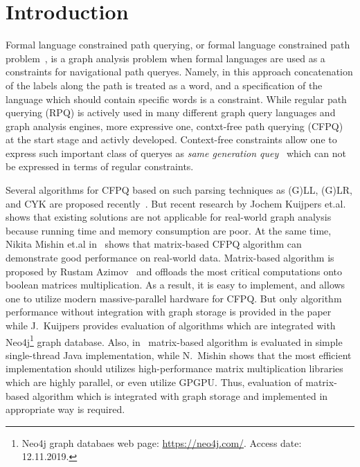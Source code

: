 \section{Introduction}

Formal language constrained path querying, or formal language constrained path problem~\cite{FLCpathProblem}, is a graph analysis problem when formal languages are used as a constraints for navigational path queryes.
Namely, in this approach concatenation of the labels along the path is treated as a word, and a specification of the language which should contain specific words is a constraint.
While regular path querying (RPQ) is actively used in many different graph query languages and graph analysis engines, more expressive one, contxt-free path querying (CFPQ)~\cite{Yannakakis} at the start stage and activly developed.
Context-free constraints allow one to express such important class of queryes as \textit{same generation quey}~\cite{FndDB} which can not be expressed in terms of regular constraints.

Several algorithms for CFPQ based on such parsing techniques as (G)LL, (G)LR, and CYK are proposed recently~\cite{bradford2007quickest,ward2008distributed,bradford2016fast,hellingsPathQuerying,Grigorev:2017:CPQ:3166094.3166104,Verbitskaia:2018:PCC:3241653.3241655,RDF,10.1007/978-3-319-91662-0_17,Medeiros:2018:EEC:3167132.3167265}.
But recent research by Jochem Kuijpers et.al.~\cite{Kuijpers:2019:ESC:3335783.3335791} shows that existing solutions are not applicable for real-world graph analysis because running time and memory consumption are poor.
At the same time, Nikita Mishin et.al in~\cite{Mishin:2019:ECP:3327964.3328503} shows that matrix-based CFPQ algorithm can demonstrate good performance on real-world data.
Matrix-based algorithm is proposed by Rustam Azimov~\cite{Azimov:2018:CPQ:3210259.3210264} and offloads the most critical computations onto boolean matrices multiplication.
As a result, it is easy to implement, and allows one to utilize modern massive-parallel hardware for CFPQ.
But only algorithm performance without integration with graph storage is provided in the paper while J.~Kuijpers provides evaluation of algorithms which are integrated with Neo4j\footnote{Neo4j graph databaes web page: \url{https://neo4j.com/}. Access date: 12.11.2019.} graph database.
Also, in~\cite{Kuijpers:2019:ESC:3335783.3335791} matrix-based algorithm is evaluated in simple single-thread Java implementation, while N.~Mishin shows that the most efficient implementation should utilizes high-performance matrix multiplication libraries which are highly parallel, or even utilize GPGPU.
Thus, evaluation of matrix-based algorithm which is integrated with graph storage and implemented in appropriate way is required.

